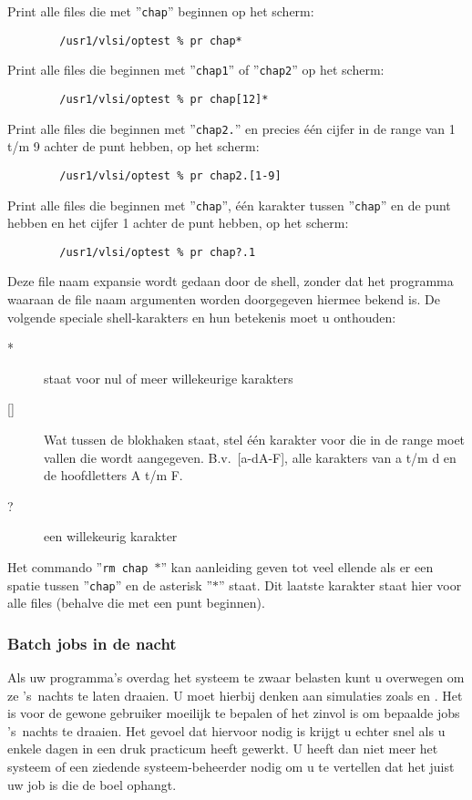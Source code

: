 Print alle files die met ''{\tt chap}'' beginnen op het scherm:
\begin{verbatim}
        /usr1/vlsi/optest % pr chap*
\end{verbatim}
Print alle files die beginnen met ''{\tt chap1}'' of ''{\tt chap2}''
op het scherm:
\begin{verbatim}
        /usr1/vlsi/optest % pr chap[12]*
\end{verbatim}
Print alle files die beginnen met ''{\tt chap2.}''
en precies \'e\'en cijfer in de 
range van 1 t/m 9 achter de punt hebben, op het scherm:
\begin{verbatim}
        /usr1/vlsi/optest % pr chap2.[1-9]
\end{verbatim}
Print alle files die beginnen met ''{\tt chap}'',
\'e\'en karakter tussen ''{\tt chap}''
en de punt hebben en het cijfer 1 achter de punt hebben, op het scherm:
\begin{verbatim}
        /usr1/vlsi/optest % pr chap?.1
\end{verbatim}
Deze file naam expansie wordt gedaan door de shell,
zonder dat het programma waaraan de file naam argumenten
worden doorgegeven hiermee bekend is.
De volgende speciale shell-karakters en hun betekenis
moet u onthouden:
\begin{description}
\item[*      ]       staat voor nul of meer willekeurige karakters
\item[{[]}]    Wat tussen de blokhaken staat, stel \'e\'en karakter voor die
in de range moet vallen die wordt aangegeven.
B.v.\ [a-dA-F], alle karakters van a t/m d en de hoofdletters A t/m F.
\item[?]       een willekeurig karakter
\end{description}
Het commando ''{\tt rm chap $\ast$}'' kan aanleiding geven tot veel
ellende als er een spatie tussen ''{\tt chap}'' en
de asterisk ''{\tt $\ast$}'' staat.
Dit laatste karakter staat hier voor alle files (behalve die met een
punt beginnen).

\subsubsection{Batch jobs in de nacht}
\label{Batch jobs in de nacht}
Als uw programma's overdag het systeem te zwaar belasten kunt u overwegen
om ze 's~nachts te laten draaien.
U moet hierbij denken aan simulaties
zoals  en .
Het is voor de gewone gebruiker moeilijk te bepalen of het zinvol is om
bepaalde jobs 's~nachts te draaien.
Het gevoel dat hiervoor nodig is 
krijgt u echter snel als u enkele dagen in een druk practicum heeft gewerkt.
U heeft dan niet meer het systeem of een ziedende systeem-beheerder nodig
om u te vertellen dat het juist uw job is die de boel ophangt.

